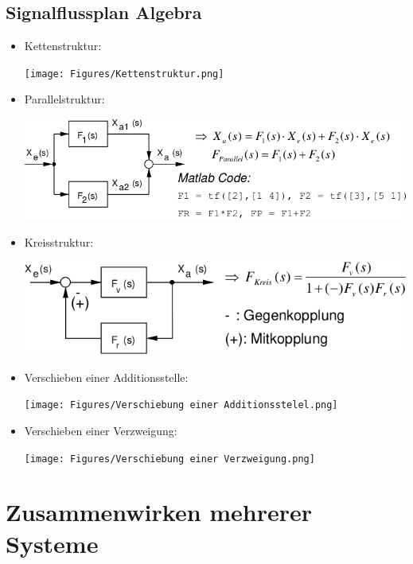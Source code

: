 \documentclass[10pt,a4paper]{article}
\begin{document}
\subsection{Signalflussplan Algebra}
\begin{itemize}[leftmargin=*]
	\item Kettenstruktur:
	      \begin{center}
		      \texttt{[image: Figures/Kettenstruktur.png]}
	      \end{center}

	\item Parallelstruktur:
	      \begin{center}
		      \includegraphics[width=0.96\columnwidth]{Figures/Parallelstruktur.png}
	      \end{center}

	\item Kreisstruktur:
	      \begin{center}
		      \includegraphics[width=0.96\columnwidth]{Figures/Kreisstruktur.png}
	      \end{center}

	\item Verschieben einer Additionsstelle:
	      \begin{center}
		      \texttt{[image: Figures/Verschiebung einer Additionsstelel.png]}
	      \end{center}

	\item Verschieben einer Verzweigung:
	      \begin{center}
		      \texttt{[image: Figures/Verschiebung einer Verzweigung.png]}
	      \end{center}
\end{itemize}

\section{Zusammenwirken mehrerer Systeme}
\end{document}
